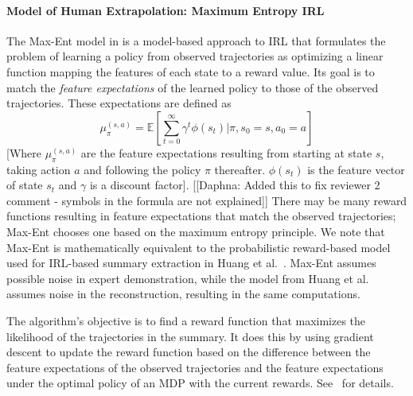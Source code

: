 \documentclass{article}
\newcommand{\comment}[2]{{\color{blue} [[{#1}: {#2}]]}}
\begin{document}
\paragraph{Model of Human Extrapolation: Maximum Entropy IRL}
The Max-Ent model in \cite{ziebart2008maximum} is a model-based approach to IRL that formulates the problem of learning a policy from observed trajectories as optimizing a linear function mapping the features of each state to a reward value. Its goal is to match the \emph{feature expectations} of the learned policy to those of the observed trajectories. These expectations are defined as 
\begin{equation}\label{eq_safcount}
  \mu_\pi^{(s,a)} = \mathbb{E}[
  \sum_{t=0}^{\infty} \gamma^t\phi(s_t)|\pi, s_0=s, a_0=a]
\end{equation} 
[Where $\mu_\pi^{(s,a)}$ are the feature expectations resulting from starting at state $s$, taking action $a$ and following the policy $\pi$ thereafter. $\phi(s_t)$ is the feature vector of state $s_t$ and $\gamma$ is a discount factor]. \comment{Daphna}{Added this to fix reviewer 2 comment - symbols in the formula are not explained} 
There may be many reward functions resulting in feature expectations that match the observed trajectories; Max-Ent chooses one based on the maximum entropy principle. We note that Max-Ent is mathematically equivalent to the probabilistic reward-based model used for IRL-based summary extraction in Huang et al.~\cite{huang17communicate}. Max-Ent assumes possible noise in expert demonstration, while the model from Huang et al. assumes noise in the reconstruction, resulting in the same computations.

The algorithm's objective is to find a reward function that maximizes the likelihood of the trajectories in the summary. It does this by using gradient descent to update the reward function based on the difference between the feature expectations of the observed trajectories and the feature expectations under the optimal policy of an MDP with the current rewards. See~\cite{ziebart2008maximum} for details.
\end{document}
